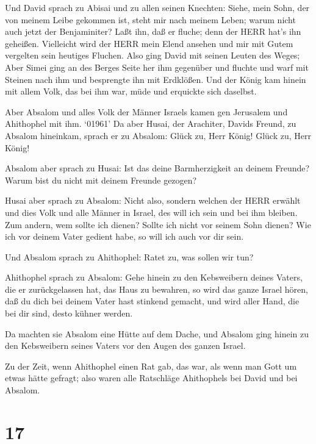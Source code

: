  Und David sprach zu Abisai und zu allen seinen Knechten:
Siehe, mein Sohn, der von meinem Leibe gekommen ist, steht mir nach
meinem Leben; warum nicht auch jetzt der Benjaminiter? Laßt ihn, daß er
fluche; denn der HERR hat's ihn geheißen.  Vielleicht wird
der HERR mein Elend ansehen und mir mit Gutem vergelten sein heutiges
Fluchen.  Also ging David mit seinen Leuten des Weges; Aber
Simei ging an des Berges Seite her ihm gegenüber und fluchte und warf
mit Steinen nach ihm und besprengte ihn mit Erdklößen.  Und
der König kam hinein mit allem Volk, das bei ihm war, müde und erquickte
sich daselbst.

 Aber Absalom und alles Volk der Männer Israels kamen gen
Jerusalem und Ahithophel mit ihm.  `01961' Da aber Husai,
der Arachiter, Davids Freund, zu Absalom hineinkam, sprach er zu
Absalom: Glück zu, Herr König! Glück zu, Herr König!

 Absalom aber sprach zu Husai: Ist das deine Barmherzigkeit
an deinem Freunde? Warum bist du nicht mit deinem Freunde gezogen?

 Husai aber sprach zu Absalom: Nicht also, sondern welchen
der HERR erwählt und dies Volk und alle Männer in Israel, des will ich
sein und bei ihm bleiben.  Zum andern, wem sollte ich
dienen? Sollte ich nicht vor seinem Sohn dienen? Wie ich vor deinem
Vater gedient habe, so will ich auch vor dir sein.

 Und Absalom sprach zu Ahithophel: Ratet zu, was sollen wir
tun?

 Ahithophel sprach zu Absalom: Gehe hinein zu den
Kebsweibern deines Vaters, die er zurückgelassen hat, das Haus zu
bewahren, so wird das ganze Israel hören, daß du dich bei deinem Vater
hast stinkend gemacht, und wird aller Hand, die bei dir sind, desto
kühner werden.

 Da machten sie Absalom eine Hütte auf dem Dache, und
Absalom ging hinein zu den Kebsweibern seines Vaters vor den Augen des
ganzen Israel.

 Zu der Zeit, wenn Ahithophel einen Rat gab, das war, als
wenn man Gott um etwas hätte gefragt; also waren alle Ratschläge
Ahithophels bei David und bei Absalom.

\hypertarget{section-16}{%
\section{17}\label{section-16}}

